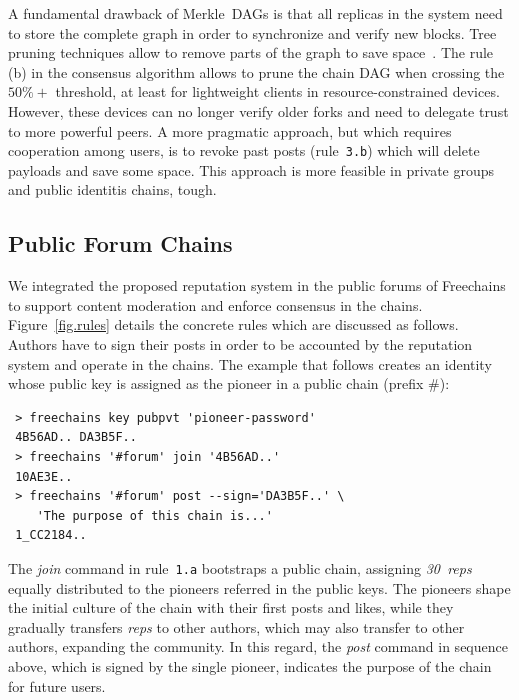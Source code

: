 \documentclass[10pt,journal,compsoc]{IEEEtran}
\newcommand{\FC}       {Freechains\xspace}
\newcommand{\reps}     {\emph{reps}\xspace}
\newcommand{\nreps}[1] {\emph{#1~reps\xspace}}
\begin{document}
A fundamental drawback of Merkle~DAGs is that all replicas in the system need
to store the complete graph in order to synchronize and verify new blocks.
Tree pruning techniques allow to remove parts of the graph to save
space~\cite{p2p.prune}.
The rule (b) in the consensus algorithm allows to prune the chain DAG when
crossing the $50\%+$ threshold, at least for lightweight clients in
resource-constrained devices.
However, these devices can no longer verify older forks and need to delegate
trust to more powerful peers.
%
A more pragmatic approach, but which requires cooperation among users, is to
revoke past posts (rule~\texttt{3.b}) which will delete payloads and save some
space.
This approach is more feasible in private groups and public identitis chains,
tough.

\subsection{Public Forum Chains}
\label{sec.consensus.chains}

We integrated the proposed reputation system in the public forums of \FC to
support content moderation and enforce consensus in the chains.
Figure~\ref{fig.rules} details the concrete rules which are discussed as
follows.
Authors have to sign their posts in order to be accounted by the reputation
system and operate in the chains.
The example that follows creates an identity whose public key is assigned as
the pioneer in a public chain (prefix $\#$):

{\footnotesize
\begin{verbatim}
 > freechains key pubpvt 'pioneer-password'
 4B56AD.. DA3B5F..
 > freechains '#forum' join '4B56AD..'
 10AE3E..
 > freechains '#forum' post --sign='DA3B5F..' \
    'The purpose of this chain is...'
 1_CC2184..
\end{verbatim}
}

The \emph{join} command in rule~\texttt{1.a} bootstraps a public chain,
assigning \nreps{30} equally distributed to the pioneers referred in the public
keys.
The pioneers shape the initial culture of the chain with their first posts and
likes, while they gradually transfers \reps to other authors, which may also
transfer to other authors, expanding the community.
%
In this regard, the \emph{post} command in sequence above, which is signed by
the single pioneer, indicates the purpose of the chain for future users.
\end{document}
